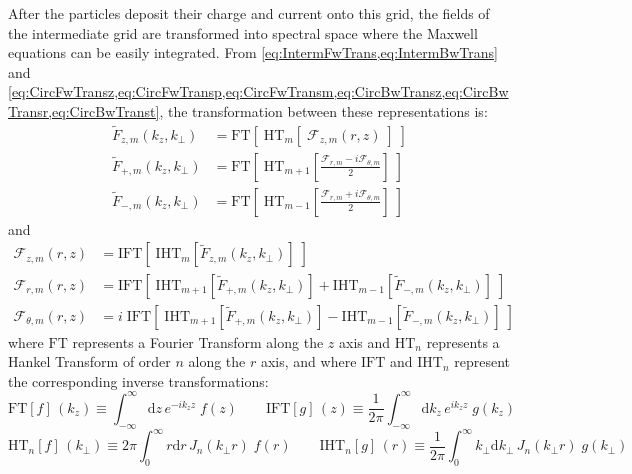 \documentclass[a4paper]{article}   	%
\newcommand{\Integ}[1]{\int_{-\infty}^{\infty} \!\!\!\!\!
  \mathrm{d}#1}
\newcommand{\RInteg}[1]{\int_{0}^{\infty} \!\!\!\!\! #1\mathrm{d}#1}
\begin{document}
After the particles deposit their charge and current onto this grid,
the fields of the intermediate grid are transformed into spectral
space where the Maxwell equations can be easily integrated. From
\cref{eq:IntermFwTrans,eq:IntermBwTrans} and
\cref{eq:CircFwTransz,eq:CircFwTransp,eq:CircFwTransm,eq:CircBwTransz,eq:CircBwTransr,eq:CircBwTranst}, the transformation between these
representations is:
\begin{align*}
\tilde{F}_{z,m}(k_z,k_\perp) & = \mathrm{FT} [ \; \mathrm{HT}_{m}
                               [ \; \mathcal{F}_{z,m}(r,z) \; ] \;]\\
\tilde{F}_{+,m}(k_z,k_\perp) &= \mathrm{FT} \left[ \; \mathrm{HT}_{m+1} \left[ \frac{
  \mathcal{F}_{r,m} -i  \mathcal{F}_{\theta,m} }{2}  \right] \;\right] \\
\tilde{F}_{-,m}(k_z,k_\perp) &= \mathrm{FT} \left[ \; \mathrm{HT}_{m-1} \left[ \frac{
  \mathcal{F}_{r,m} +i  \mathcal{F}_{\theta,m} }{2}  \right] \;\right] 
\end{align*}
and
\begin{align*}
\mathcal{F}_{z,m}(r,z) &= \mathrm{IFT} [\; \mathrm{IHT}_{m} [
                         \tilde{F}_{z,m}(k_z,k_\perp) ] \; ] \\
\mathcal{F}_{r,m}(r,z) & = \mathrm{IFT} \left[ \; \mathrm{IHT}_{m+1}
                         [ \tilde{F}_{+,m}(k_z,k_\perp) ] + \mathrm{IHT}_{m-1} [
                         \tilde{F}_{-,m}(k_z,k_\perp) ] \; \right] \\
\mathcal{F}_{\theta,m}(r,z) & = i\;\mathrm{IFT} \left[ \; \mathrm{IHT}_{m+1}
                         [ \tilde{F}_{+,m}(k_z,k_\perp) ] - \mathrm{IHT}_{m-1} [ \tilde{F}_{-,m}(k_z,k_\perp) ] \; \right]
\end{align*}
where $\mathrm{FT}$ represents a Fourier Transform along the $z$
axis and $\mathrm{HT}_{n}$ represents a Hankel Transform of order
$n$ along the $r$ axis, and where $\mathrm{IFT}$ and
$\mathrm{IHT}_{n}$ represent the corresponding inverse
transformations:
\[ \mathrm{FT} [f]\, (k_z) \equiv \Integ{z} \, e^{-ik_zz} \; f(z) \qquad 
\mathrm{IFT} [g] \,(z)\equiv \frac{1}{2\pi}\Integ{k_z} \, e^{ik_zz} \;  g(k_z)\]
\[ \mathrm{HT}_{n} [f]\,(k_\perp) \equiv 2\pi \RInteg{r} \,
J_{n}(k_\perp r) \; f(r) \qquad 
\mathrm{IHT}_{n} [g]\,(r) \equiv \frac{1}{2\pi}\RInteg{k_\perp} \,  J_{n}(k_\perp r)  \;  g(k_\perp) \]
\end{document}
